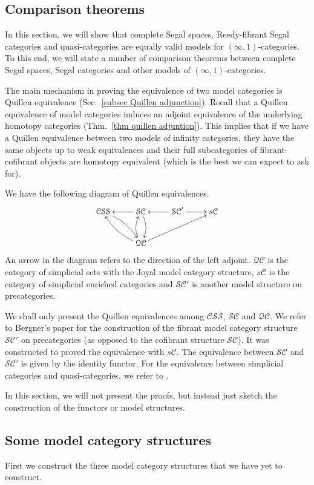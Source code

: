 \begin{refsection}
\section{Comparison theorems}\label{sec comp thms}
In this section, we will show that complete Segal spaces, Reedy-fibrant Segal categories and quasi-categories are equally valid models for $(\infty,1)$-categories. To this end, we will state a number of comparison theorems between complete Segal spaces, Segal categories and other models of $(\infty,1)$-categories.

The main mechanism in proving the equivalence of two model categories is Quillen equivalence (Sec.~\ref{subsec Quillen adjunction}). Recall that a Quillen equivalence of model categories induces an adjoint equivalence of the underlying homotopy categories (Thm.~\ref{thm quillen adjuntion}).
This implies that if we have a Quillen equivalence between two models of infinity categories, they have the same objects up to weak equivalences and their full subcategories of fibrant-cofibrant objects are homotopy equivalent (which is the best we can expect to ask for).

We have the following diagram of Quillen equivalences.
$$\xymatrix{\mathcal{CSS}\ar@/^/[dr]&\mathcal{SC}\ar[l]\ar@/^/[d]&\mathcal{SC}'\ar[l]\ar[r]&s\mathcal{C}\\
&\mathcal{QC}\ar@/^/[ul]\ar@/^/[u]\ar[urr]}$$
An arrow in the diagram refers to the direction of the left adjoint. $\mathcal{QC}$ is the category of simplicial sets with the Joyal model category structure, $s\mathcal{C}$ is the category of simplicial enriched categories and $\mathcal{SC}'$ is another model structure on precategories.

We shall only present the Quillen equivalences among $\mathcal{CSS}$, $\mathcal{SC}$ and $\mathcal{QC}$. We refer to Bergner's paper \cite{bergner3} for the construction of the fibrant model category structure $\mathcal{SC}'$ on precategories (as opposed to the cofibrant structure $\mathcal{SC}$). It was constructed to proved the equivalence with $s\mathcal{C}$. The equivalence between $\mathcal{SC}$ and $\mathcal{SC}'$ is given by the identity functor. For the equivalence between simplicial categories and quasi-categories, we refer to \cite{joyal3}.

In this section, we will not present the proofs, but instead just sketch the construction of the functors or model structures.

\subsection{Some model category structures}
First we construct the three model category structures that we have yet to construct.


\end{refsection}
